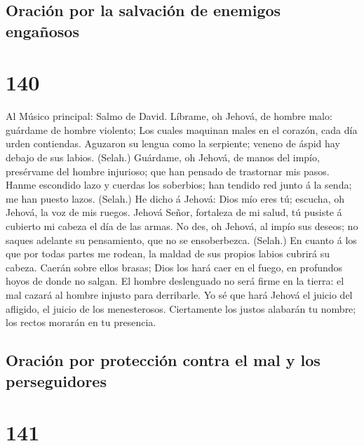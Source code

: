 \hypertarget{oraciuxf3n-por-la-salvaciuxf3n-de-enemigos-engauxf1osos}{%
\subsection{Oración por la salvación de enemigos
engañosos}\label{oraciuxf3n-por-la-salvaciuxf3n-de-enemigos-engauxf1osos}}

\hypertarget{section-139}{%
\section{140}\label{section-139}}

 Al Músico principal: Salmo de David. Líbrame, oh Jehová,
de hombre malo: guárdame de hombre violento;  Los cuales
maquinan males en el corazón, cada día urden contiendas. 
Aguzaron su lengua como la serpiente; veneno de áspid hay debajo de sus
labios. (Selah.)  Guárdame, oh Jehová, de manos del impío,
presérvame del hombre injurioso; que han pensado de trastornar mis
pasos.  Hanme escondido lazo y cuerdas los soberbios; han
tendido red junto á la senda; me han puesto lazos. (Selah.)
 He dicho á Jehová: Dios mío eres tú; escucha, oh Jehová,
la voz de mis ruegos.  Jehová Señor, fortaleza de mi
salud, tú pusiste á cubierto mi cabeza el día de las armas.
 No des, oh Jehová, al impío sus deseos; no saques
adelante su pensamiento, que no se ensoberbezca. (Selah.) 
En cuanto á los que por todas partes me rodean, la maldad de sus propios
labios cubrirá su cabeza.  Caerán sobre ellos brasas;
Dios los hará caer en el fuego, en profundos hoyos de donde no salgan.
 El hombre deslenguado no será firme en la tierra: el mal
cazará al hombre injusto para derribarle.  Yo sé que hará
Jehová el juicio del afligido, el juicio de los menesterosos.
 Ciertamente los justos alabarán tu nombre; los rectos
morarán en tu presencia.

\hypertarget{oraciuxf3n-por-protecciuxf3n-contra-el-mal-y-los-perseguidores}{%
\subsection{Oración por protección contra el mal y los
perseguidores}\label{oraciuxf3n-por-protecciuxf3n-contra-el-mal-y-los-perseguidores}}

\hypertarget{section-140}{%
\section{141}\label{section-140}}

